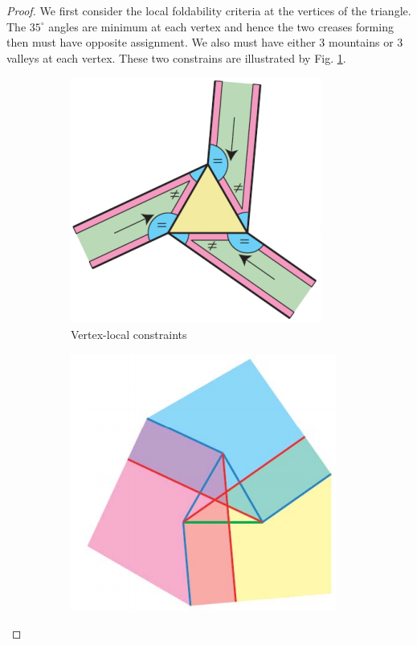 \begin{proof}
  We first consider the local foldability criteria at the vertices of
  the triangle. The $35^\circ$ angles are minimum at each vertex and
  hence the two creases forming then must have opposite assignment. We
  also must have either 3 mountains or 3 valleys at each vertex. These
  two constrains are illustrated by Fig. \ref{constraints-local}.
  \begin{figure}[h!tbp]
    \centering
    \begin{subfigure}{.35\textwidth}
      \includegraphics[width=\textwidth]{origami-data/clause-constraints}
      \caption{Vertex-local constraints}
      \label{constraints-local}
    \end{subfigure}
    \begin{subfigure}{.35\textwidth}
      \includegraphics[width=\textwidth]{origami-data/clause-folded}

\end{subfigure}
\end{figure}
\end{proof}
